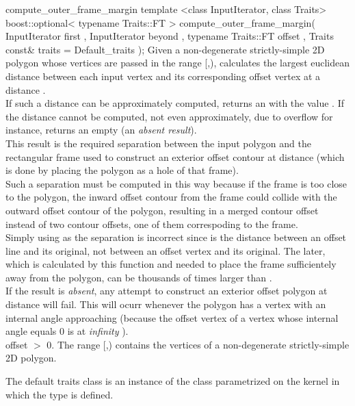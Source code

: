 \begin{ccRefFunction}{compute_outer_frame_margin}
\ccFunction
{template <class InputIterator, class Traits>
boost::optional< typename Traits::FT >
compute_outer_frame_margin( InputIterator       first
                          , InputIterator       beyond
                          , typename Traits::FT offset
                          , Traits const&       traits = Default_traits
                          );
} 
{Given a non-degenerate strictly-simple 2D polygon whose vertices are passed 
in the range [,), calculates the largest euclidean distance
 between each input vertex and its corresponding offset vertex at
a distance .\\
If such a distance can be approximately computed, returns an  with the value . If the distance cannot be computed, not even approximately, due to overflow for instance, returns an empty  (an {\em absent result}).\\
This result is the required separation between the input polygon
and the rectangular frame used to construct an exterior offset contour
at distance  (which is done by placing the polygon as a hole of that frame).\\
Such a separation must be computed in this way because if the frame is 
too close to the polygon, the inward offset contour from the frame could
collide with the outward offset contour of the polygon, resulting in a merged
contour offset instead of two contour offsets, one of them correspoding to the frame.\\
Simply using  as the separation is incorrect since  is the distance 
between an offset line and its original, not between an offset vertex and its original.
The later, which is calculated by this function and needed to place the frame sufficientely
away from the polygon, can be thousands of times larger than .\\
If the result is {\em absent}, any attempt to construct an exterior offset polygon at distance  will fail. This will ocurr whenever the polygon has a vertex with an internal angle approaching  (because the offset vertex of a vertex whose internal angle equals 0 is at {\em infinity} ).\\
\ccPrecond offset $>$ 0.
\ccPrecond The range [,) contains the vertices
of a non-degenerate strictly-simple 2D polygon.
}

The default traits class  is an instance of the
class  parametrized on
the kernel in which the type  is defined.


\end{ccRefFunction}
